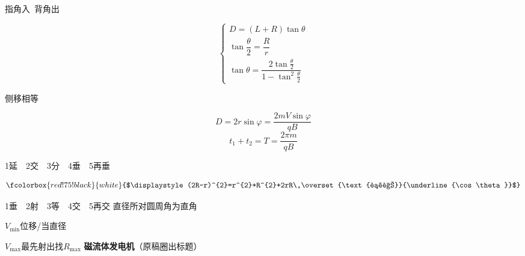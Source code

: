 指角入\ 背角出


\[
\begin{cases}D=(L+R)\tan\theta\\[4pt] \tan\dfrac{\theta}{2}=\dfrac{R}{r}\\[8pt] \tan\theta=\dfrac{2\tan\frac{\theta}{2}}{1-\tan^{2}\frac{\theta}{2}}\end{cases}
\]


侧移相等

\[ D=2r\sin\varphi=\frac{2mV\sin\varphi}{qB} \]
\[ t_1+t_2=T=\frac{2\pi m}{qB} \]

1延\ \ 2交\ \ 3分\ \ 4垂\ \ 5再垂

\[ \fcolorbox{red!75!black}{white}{$\displaystyle (2R-r)^{2}=r^{2}+R^{2}+2rR\,\overset{\text{补角}}{\underline{\cos\theta}}$} \]

1垂\ \ 2射\ \ 3等\ \ 4交\ \ 5再交
直径所对圆周角为直角

$V_{\min}$\quad 位移/当直径

$V_{\max}$\quad 最先射出找$R_{\max}$
\textbf{磁流体发电机}（原稿圈出标题）

